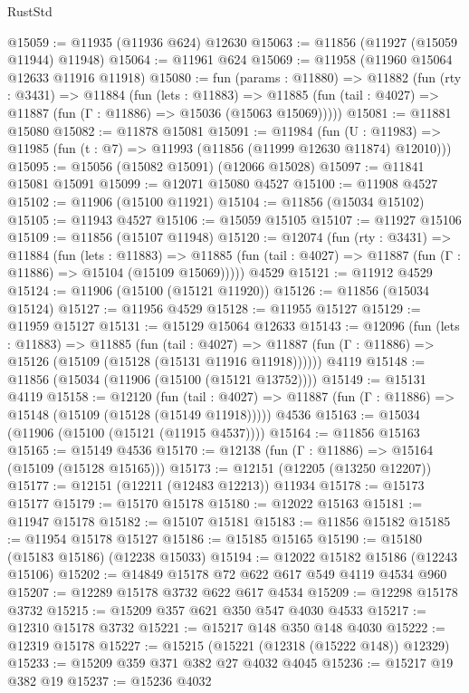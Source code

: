 \begin{lexlean}{RustStd}
\begin{coremodule}
@15059 := @11935 (@11936 @624) @12630
@15063 := @11856 (@11927 (@15059 @11944) @11948)
@15064 := @11961 @624
@15069 := @11958 (@11960 @15064 @12633 @11916 @11918)
@15080 := fun (params : @11880) =>
  @11882
    (fun (rty : @3431) =>
    @11884
      (fun (lets : @11883) =>
      @11885 (fun (tail : @4027) => @11887 (fun (Γ : @11886) => @15036 (@15063 @15069)))))
@15081 := @11881 @15080
@15082 := @11878 @15081
@15091 := @11984
    (fun (U : @11983) => @11985 (fun (t : @7) => @11993 (@11856 (@11999 @12630 @11874) @12010)))
@15095 := @15056 (@15082 @15091) (@12066 @15028)
@15097 := @11841 @15081 @15091
@15099 := @12071 @15080 @4527
@15100 := @11908 @4527
@15102 := @11906 (@15100 @11921)
@15104 := @11856 (@15034 @15102)
@15105 := @11943 @4527
@15106 := @15059 @15105
@15107 := @11927 @15106
@15109 := @11856 (@15107 @11948)
@15120 := @12074
    (fun (rty : @3431) =>
    @11884
      (fun (lets : @11883) =>
      @11885 (fun (tail : @4027) => @11887 (fun (Γ : @11886) => @15104 (@15109 @15069)))))
    @4529
@15121 := @11912 @4529
@15124 := @11906 (@15100 (@15121 @11920))
@15126 := @11856 (@15034 @15124)
@15127 := @11956 @4529
@15128 := @11955 @15127
@15129 := @11959 @15127
@15131 := @15129 @15064 @12633
@15143 := @12096
    (fun (lets : @11883) =>
    @11885
      (fun (tail : @4027) =>
      @11887 (fun (Γ : @11886) => @15126 (@15109 (@15128 (@15131 @11916 @11918))))))
    @4119
@15148 := @11856 (@15034 (@11906 (@15100 (@15121 @13752))))
@15149 := @15131 @4119
@15158 := @12120
    (fun (tail : @4027) => @11887 (fun (Γ : @11886) => @15148 (@15109 (@15128 (@15149 @11918)))))
    @4536
@15163 := @15034 (@11906 (@15100 (@15121 (@11915 @4537))))
@15164 := @11856 @15163
@15165 := @15149 @4536
@15170 := @12138 (fun (Γ : @11886) => @15164 (@15109 (@15128 @15165)))
@15173 := @12151 (@12205 (@13250 @12207))
@15177 := @12151 (@12211 (@12483 @12213)) @11934
@15178 := @15173 @15177
@15179 := @15170 @15178
@15180 := @12022 @15163
@15181 := @11947 @15178
@15182 := @15107 @15181
@15183 := @11856 @15182
@15185 := @11954 @15178 @15127
@15186 := @15185 @15165
@15190 := @15180 (@15183 @15186) (@12238 @15033)
@15194 := @12022 @15182 @15186 (@12243 @15106)
@15202 := @14849 @15178 @72 @622 @617 @549 @4119 @4534 @960
@15207 := @12289 @15178 @3732 @622 @617 @4534
@15209 := @12298 @15178 @3732
@15215 := @15209 @357 @621 @350 @547 @4030 @4533
@15217 := @12310 @15178 @3732
@15221 := @15217 @148 @350 @148 @4030
@15222 := @12319 @15178
@15227 := @15215 (@15221 (@12318 (@15222 @148)) @12329)
@15233 := @15209 @359 @371 @382 @27 @4032 @4045
@15236 := @15217 @19 @382 @19
@15237 := @15236 @4032

\end{coremodule}
\end{lexlean}
